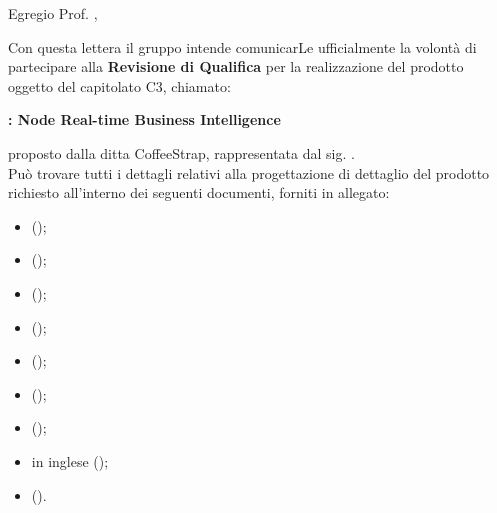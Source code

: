 \documentclass{letter}
\begin{document}
\begin{letter}{}

	\vspace{4cm}
	
	\opening{Egregio Prof. \committente{},}
	
	Con questa lettera il gruppo \groupname{} intende comunicarLe ufficialmente la volontà di partecipare alla \textbf{Revisione di Qualifica} per la realizzazione del prodotto oggetto del capitolato C3, chiamato:
	\begin{center}
		\textbf{\projectname{}: Node Real-time Business Intelligence}
	\end{center}
	proposto dalla ditta CoffeeStrap, rappresentata dal sig. \proponente{}.\\
	Può trovare tutti i dettagli relativi alla progettazione di dettaglio del prodotto richiesto all'interno dei seguenti documenti, forniti in allegato:

	\begin{itemize}
		\item {} ();
		\item {} ();
		\item {} ();
		\item {} ();
		\item {} ();
		\item {} ();
		\item {} ();
		\item {} in inglese ();
		\item {} ().
	\end{itemize}
	

\end{letter}
\end{document}
